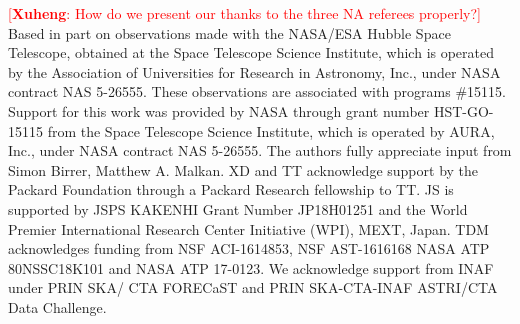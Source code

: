 \documentclass[twocolumn,trackchanges]{aastex63}
\newcommand{\hst}{{\it HST}}
\newcommand{\mbh}{$\mathcal M_{\rm BH}$}
\newcommand{\lhost}{$L_{\rm host}$}
\newcommand{\mstar}{{$M_*$}}
\newcommand{\ding}[1]{\textcolor{red}{[{\bf Xuheng}: #1]}}
\begin{document}



\acknowledgments
\ding{How do we present our thanks to the three NA referees properly?}
Based in part on observations made with the NASA/ESA Hubble Space Telescope, obtained at the Space Telescope Science Institute, which is operated by the Association of Universities for Research in Astronomy, Inc., under NASA contract NAS 5-26555. These observations are associated with programs \#15115. Support for this work was provided by NASA through grant number HST-GO-15115 from the Space Telescope Science Institute, which is operated by AURA, Inc., under NASA contract NAS 5-26555. The authors fully appreciate input from Simon Birrer, Matthew A. Malkan. XD and TT acknowledge support by the Packard Foundation through a Packard Research fellowship to TT. JS is supported by JSPS KAKENHI Grant Number JP18H01251 and the World Premier International Research Center Initiative (WPI), MEXT, Japan. TDM acknowledges funding from NSF ACI-1614853,  NSF AST-1616168 NASA ATP 80NSSC18K101 and NASA ATP 17-0123. We acknowledge support from INAF under PRIN SKA/ CTA FORECaST and PRIN SKA-CTA-INAF ASTRI/CTA Data Challenge. 
\end{document}
